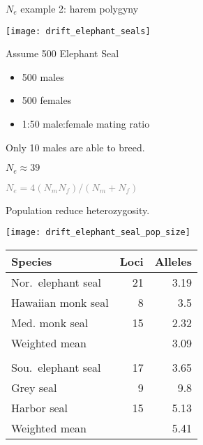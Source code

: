 \documentclass[t]{beamer}
\begin{document}
\begin{frame}[t]{$N_e$ example 2: harem polygyny}

\vspace{-\baselineskip}

\raggedcolumns
\begin{multicols}{2}

\noindent\texttt{[image: drift\_elephant\_seals]}

\columnbreak
Assume 500 Elephant Seal

\begin{itemize}[label=\textcolor{white}{\textbullet}, leftmargin=6pt]
\item 500 males
\item 500 females
\item 1:50 male:female mating ratio
\end{itemize}

Only 10 males are able to breed.

\bigskip

\textcolor{orange5}{$N_e \approx 39$}


\vspace{3\baselineskip}

\textcolor{gray}{$N_e = 4(N_mN_f)/(N_m + N_f)$}
\end{multicols}


\end{frame}


\begin{frame}[t]{Population  reduce heterozygosity.}

\vspace{-\baselineskip}

\begin{multicols}{2}

\texttt{[image: drift\_elephant\_seal\_pop\_size]}

\columnbreak
{\footnotesize
\begin{tabular}{@{}L{2.9cm}rr@{}}

\toprule
Species	& Loci	& Alleles \tabularnewline
\midrule
Nor.~elephant seal	 &  21	 &  3.19 \tabularnewline
Hawaiian monk seal	 &  8	 &  3.5 \tabularnewline
Med. monk seal	 &  15	 &  2.32 \\[0.75ex]
Weighted mean	& & 3.09 \tabularnewline
& & \tabularnewline
Sou.~elephant seal	 &  17	 &  3.65 \tabularnewline
Grey seal	 &  9	 &  9.8 \tabularnewline
Harbor seal	 &  15	 &  5.13 \\[0.75ex]
Weighted mean	& & 5.41 \tabularnewline
\bottomrule

\end{tabular}
}%
\end{multicols}

\vfilll

\end{frame}
\end{document}
